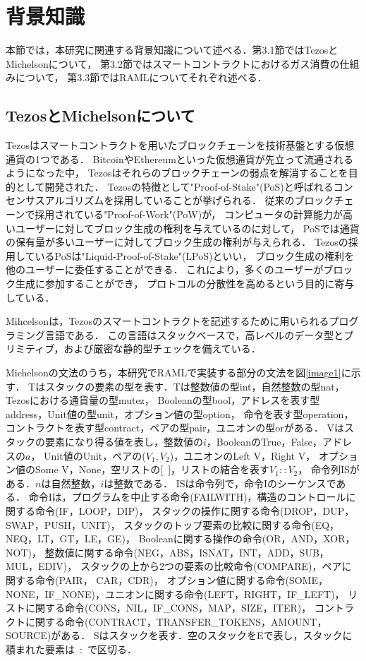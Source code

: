 \documentclass{kuisthesis}
\begin{document}
\section{背景知識}\label{sec-preliminary}
本節では，本研究に関連する背景知識について述べる．第3.1節ではTezosとMichelsonについて，
第3.2節ではスマートコントラクトにおけるガス消費の仕組みについて，
第3.3節ではRAMLについてそれぞれ述べる．

\subsection{TezosとMichelsonについて}\label{subsec-pre-tezos}
Tezosはスマートコントラクトを用いたブロックチェーンを技術基盤とする仮想通貨の1つである．
BitcoinやEthereumといった仮想通貨が先立って流通されるようになった中，
Tezosはそれらのブロックチェーンの弱点を解消することを目的として開発された．
Tezosの特徴として"Proof-of-Stake"(PoS)と呼ばれるコンセンサスアルゴリズムを採用していることが挙げられる．
従来のブロックチェーンで採用されている"Proof-of-Work"(PoW)が，
コンピュータの計算能力が高いユーザーに対してブロック生成の権利を与えているのに対して，
PoSでは通貨の保有量が多いユーザーに対してブロック生成の権利が与えられる．
Tezosの採用しているPoSは"Liquid-Proof-of-Stake"(LPoS)といい，
ブロック生成の権利を他のユーザーに委任することができる．
これにより，多くのユーザーがブロック生成に参加することができ，
プロトコルの分散性を高めるという目的に寄与している．

Mihcelsonは，Tezosのスマートコントラクトを記述するために用いられるプログラミング言語である．
この言語はスタックベースで，高レベルのデータ型とプリミティブ，および厳密な静的型チェックを備えている\cite{michelson}．

Michelsonの文法のうち，本研究でRAMLで実装する部分の文法を図\ref{image1}に示す．
Tはスタックの要素の型を表す．Tは整数値の型int，自然整数の型nat，Tezosにおける通貨量の型mutez，
Booleanの型bool，アドレスを表す型address，Unit値の型unit，オプション値の型option，
命令を表す型operation，コントラクトを表す型contract，ペアの型pair，ユニオンの型orがある．
Vはスタックの要素になり得る値を表し，整数値の$i$，BooleanのTrue，False，アドレスの$a$，
Unit値のUnit，ペアの($V_1,V_2$)，ユニオンのLeft V，Right V，
オプション値のSome V，None，空リストの[\ ]，リストの結合を表す$V_1 :: V_2$，
命令列ISがある．$n$は自然整数，$i$は整数である．
ISは命令列で，命令Iのシーケンスである．
命令Iは，プログラムを中止する命令(FAILWITH)，構造のコントロールに関する命令(IF，LOOP，DIP)，
スタックの操作に関する命令(DROP，DUP，SWAP，PUSH，UNIT)，
スタックのトップ要素の比較に関する命令(EQ，NEQ，LT，GT，LE，GE)，
Booleanに関する操作の命令(OR，AND，XOR，NOT)，
整数値に関する命令(NEG，ABS，ISNAT，INT，ADD，SUB，MUL，EDIV)，
スタックの上から2つの要素の比較命令(COMPARE)，ペアに関する命令(PAIR， CAR，CDR)，
オプション値に関する命令(SOME，NONE，IF\_NONE)，ユニオンに関する命令(LEFT，RIGHT，IF\_LEFT)，
リストに関する命令(CONS，NIL，IF\_CONS，MAP，SIZE，ITER)，
コントラクトに関する命令(CONTRACT，TRANSFER\_TOKENS，AMOUNT，SOURCE)がある．
Sはスタックを表す．空のスタックをEで表し，スタックに積まれた要素は\ :\ で区切る．
\end{document}
